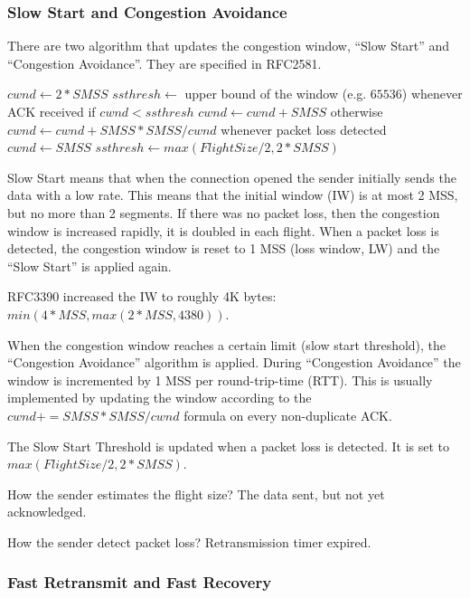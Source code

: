 \subsubsection*{Slow Start and Congestion Avoidance}

There are two algorithm that updates the congestion window, ``Slow Start''
and ``Congestion Avoidance''. They are specified in RFC2581.

\begin{pseudocode}
$cwnd \gets 2*SMSS$
$ssthresh \gets $ upper bound of the window (e.g. $65536$)
whenever ACK received
  if $cwnd < ssthresh$
    $cwnd \gets cwnd + SMSS$
  otherwise
    $cwnd \gets cwnd + SMSS*SMSS/cwnd$
whenever packet loss detected
  $cwnd \gets SMSS$
  $ssthresh \gets max(FlightSize/2, 2*SMSS)$
\end{pseudocode}

Slow Start means that when the connection opened the sender initially
sends the data with a low rate. This means that the initial
window (IW) is at most 2 MSS, but no more than 2 segments. If there was no packet loss,
then the congestion window is increased rapidly, it is doubled in each flight.
When a packet loss is detected, the congestion window is reset to 1 MSS (loss window, LW)
and the ``Slow Start'' is applied again.

\begin{note}
RFC3390 increased the IW to roughly 4K bytes: $min(4*MSS, max(2*MSS, 4380))$.
\end{note}

When the congestion window reaches a certain limit (slow start threshold),
the ``Congestion Avoidance'' algorithm is applied. During ``Congestion Avoidance''
the window is incremented by 1 MSS per round-trip-time (RTT). This is usually
implemented by updating the window according to the $ cwnd += SMSS*SMSS/cwnd $
formula on every non-duplicate ACK.

The Slow Start Threshold is updated when a packet loss is detected.
It is set to $max(FlightSize/2, 2*SMSS)$.

How the sender estimates the flight size? The data sent, but not yet acknowledged.

How the sender detect packet loss? Retransmission timer expired.


\subsubsection*{Fast Retransmit and Fast Recovery}

